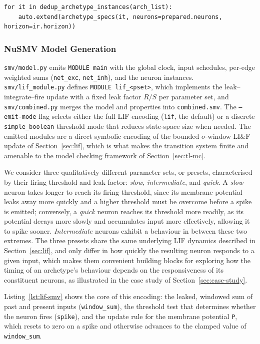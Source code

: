 \documentclass[
]{ceurart}
\begin{document}
\begin{lstlisting}[style=pythoncode,caption={Property emission order in \texttt{properties.py}.},label=lst:properties-order]
for it in dedup_archetype_instances(arch_list):
    auto.extend(archetype_specs(it, neurons=prepared.neurons, horizon=ir.horizon))
\end{lstlisting}

\subsubsection{NuSMV Model Generation}

\texttt{smv/model.py} emits \texttt{MODULE main} with the global clock,
input schedules, per-edge weighted sums (\texttt{net\_exc},
\texttt{net\_inh}), and the neuron instances. \texttt{smv/lif\_module.py}
defines \texttt{MODULE lif\_<pset>}, which implements the
leak--integrate--fire update with a fixed leak factor $R/S$ per parameter
set, and \texttt{smv/combined.py} merges the model and properties into
\texttt{combined.smv}. The \texttt{--emit-mode} flag selects either the
full LIF encoding (\texttt{lif}, the default) or a discrete
\texttt{simple\_boolean} threshold mode that reduces state-space size when
needed. The emitted modules are a direct symbolic encoding of the bounded
$\sigma$-window LI\&F update of Section~\ref{sec:lif}, which is what makes
the transition system finite and amenable to the model checking framework
of Section~\ref{sec:tl-mc}.

We consider three qualitatively different parameter sets, or presets,
characterised by their firing threshold and leak factor: \emph{slow},
\emph{intermediate}, and \emph{quick}. A \emph{slow} neuron takes longer to
reach its firing threshold, since its membrane potential leaks away more
quickly and a higher threshold must be overcome before a spike is emitted;
conversely, a \emph{quick} neuron reaches its threshold more readily, as its
potential decays more slowly and accumulates input more effectively,
allowing it to spike sooner. \emph{Intermediate} neurons exhibit a
behaviour in between these two extremes. The three presets share the same
underlying LIF dynamics described in Section~\ref{sec:lif}, and only differ
in how quickly the resulting neuron responds to a given input, which makes
them convenient building blocks for exploring how the timing of an
archetype's behaviour depends on the responsiveness of its constituent
neurons, as illustrated in the case study of Section~\ref{sec:case-study}.

Listing~\ref{lst:lif-smv} shows the core of this encoding: the leaked,
windowed sum of past and present inputs (\texttt{window\_sum}), the
threshold test that determines whether the neuron fires (\texttt{spike}),
and the update rule for the membrane potential \texttt{P}, which resets
to zero on a spike and otherwise advances to the clamped value of
\texttt{window\_sum}.
\end{document}
